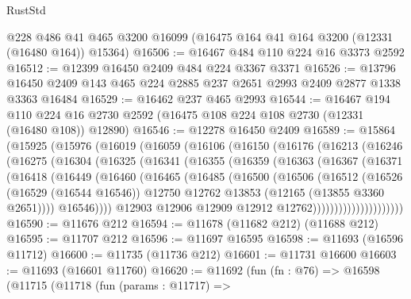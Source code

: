 \begin{lexlean}{RustStd}
\begin{coremodule}
    @228
    @486
    @41
    @465
    @3200
    @16099
    (@16475 @164 @41 @164 @3200 (@12331 (@16480 @164)) @15364)
@16506 := @16467 @484 @110 @224 @16 @3373 @2592
@16512 := @12399 @16450 @2409 @484 @224 @3367 @3371
@16526 := @13796 @16450 @2409 @143 @465 @224 @2885 @237 @2651 @2993 @2409 @2877 @1338 @3363 @16484
@16529 := @16462 @237 @465 @2993
@16544 := @16467
    @194
    @110
    @224
    @16
    @2730
    @2592
    (@16475 @108 @224 @108 @2730 (@12331 (@16480 @108)) @12890)
@16546 := @12278 @16450 @2409
@16589 := @15864
    (@15925
      (@15976
        (@16019
          (@16059
            (@16106
              (@16150
                (@16176
                  (@16213
                    (@16246
                      (@16275
                        (@16304
                          (@16325
                            (@16341
                              (@16355
                                (@16359
                                  (@16363
                                    (@16367
                                      (@16371
                                        (@16418
                                          (@16449
                                            (@16460
                                              (@16465
                                                (@16485
                                                  (@16500
                                                    (@16506
                                                      (@16512
                                                        (@16526
                                                          (@16529 (@16544 @16546))
                                                          @12750
                                                          @12762
                                                          @13853
                                                          (@12165 (@13855 @3360 @2651))))
                                                      @16546))))
                                              @12903
                                              @12906
                                              @12909
                                              @12912
                                              @12762)))))))))))))))))))))
@16590 := @11676 @212
@16594 := @11678 (@11682 @212) (@11688 @212)
@16595 := @11707 @212
@16596 := @11697 @16595
@16598 := @11693 (@16596 @11712)
@16600 := @11735 (@11736 @212)
@16601 := @11731 @16600
@16603 := @11693 (@16601 @11760)
@16620 := @11692
    (fun (fn : @76) =>
    @16598
      (@11715
        (@11718
          (fun (params : @11717) =>

\end{coremodule}
\end{lexlean}
